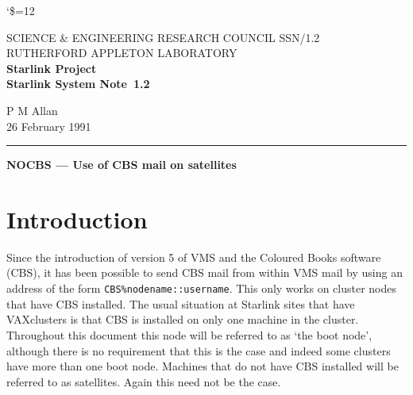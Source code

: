 \pagestyle{myheadings}

\newcommand{\stardoccategory}  {Starlink System Note}
\newcommand{\stardocinitials}  {SSN}
\newcommand{\stardocnumber}    {1.2}
\newcommand{\stardocauthors}   {P M Allan}
\newcommand{\stardocdate}      {26 February 1991}
\newcommand{\stardoctitle}     {NOCBS --- Use of CBS mail on satellites}

\newcommand{\stardocname}{\stardocinitials /\stardocnumber}
\markright{\stardocname}
\setlength{\textwidth}{160mm}
\setlength{\textheight}{240mm}
\setlength{\topmargin}{-5mm}
\setlength{\oddsidemargin}{0mm}
\setlength{\evensidemargin}{0mm}
\setlength{\parindent}{0mm}
\setlength{\parskip}{\medskipamount}
\setlength{\unitlength}{1mm}


\catcode`\$=12 

\renewcommand{\_}{{\tt\char'137}}


\thispagestyle{empty}
SCIENCE \& ENGINEERING RESEARCH COUNCIL \hfill \stardocname\\
RUTHERFORD APPLETON LABORATORY\\
{\large\bf Starlink Project\\}
{\large\bf \stardoccategory\ \stardocnumber}
\begin{flushright}
\stardocauthors\\
\stardocdate
\end{flushright}
\vspace{-4mm}
\rule{\textwidth}{0.5mm}
\vspace{5mm}
\begin{center}
{\Large\bf \stardoctitle}
\end{center}
\vspace{5mm}

\section{Introduction}

Since the introduction of version 5 of VMS and the Coloured Books software
(CBS), it has been possible to send CBS mail from within VMS mail by using an
address of the form {\tt CBS\%nodename::username}. This only works
on cluster nodes that have CBS installed. The usual situation at Starlink sites
that have VAXclusters is that CBS is installed on only one machine in the
cluster. Throughout this document this node will be referred to as `the boot
node', although there is no requirement that this is the case and indeed some
clusters have more than one boot node. Machines that do not have CBS installed
will be referred to as satellites. Again this need not be the case.

